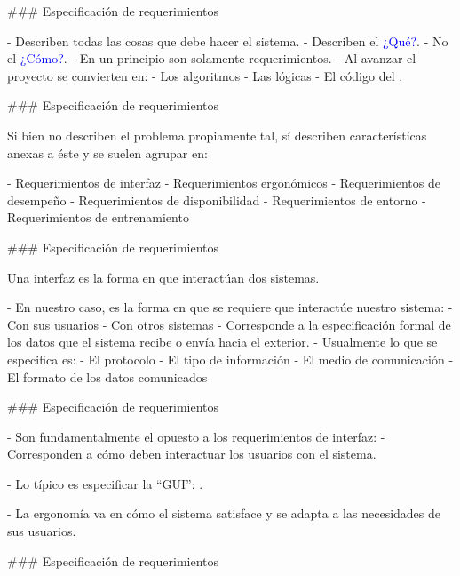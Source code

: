 ### Especificación de requerimientos

\newline

- Describen todas las cosas que debe hacer el sistema.
    - Describen el \textcolor{blue}{¿Qué?}.
    - No el \textcolor{blue}{¿Cómo?}.
- En un principio son solamente requerimientos.
- Al avanzar el proyecto se convierten en:
    - Los algoritmos
    - Las lógicas
    - El código del .

### Especificación de requerimientos

\newline

Si bien no describen el problema propiamente tal, sí describen características anexas a éste y
se suelen agrupar en:

- Requerimientos de interfaz
- Requerimientos ergonómicos
- Requerimientos de desempeño
- Requerimientos de disponibilidad
- Requerimientos de entorno
- Requerimientos de entrenamiento

### Especificación de requerimientos

\newline

Una interfaz es la forma en que interactúan dos sistemas.\newline

- En nuestro caso, es la forma en que se requiere que interactúe nuestro sistema:
    - Con sus usuarios
    - Con otros sistemas
- Corresponde a la especificación formal de los datos que el sistema recibe o envía hacia
el exterior.
- Usualmente lo que se especifica es:
    - El protocolo
    - El tipo de información
    - El medio de comunicación
    - El formato de los datos comunicados

### Especificación de requerimientos

\newline

- Son fundamentalmente el opuesto a los requerimientos de interfaz:
    - Corresponden a cómo deben interactuar los usuarios con el sistema.

- Lo típico es especificar la ``GUI'': .

- La ergonomía va en cómo el sistema satisface y se adapta a las necesidades
de sus usuarios.

### Especificación de requerimientos

